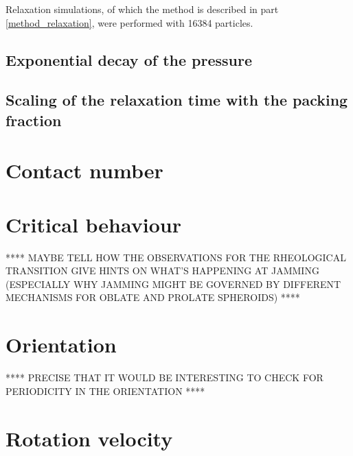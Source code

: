 \documentclass[class=report, float=false, crop=false]{standalone}
\begin{document}
Relaxation simulations, of which the method is described in part \ref{method_relaxation}, were performed with 16384 particles.\\



\subsection{Exponential decay of the pressure}

\subsection{Scaling of the relaxation time with the packing fraction}

\section{Contact number}

\section{Critical behaviour}

**** MAYBE TELL HOW THE OBSERVATIONS FOR THE RHEOLOGICAL TRANSITION GIVE HINTS ON WHAT'S HAPPENING AT JAMMING (ESPECIALLY WHY JAMMING MIGHT BE GOVERNED BY DIFFERENT MECHANISMS FOR OBLATE AND PROLATE SPHEROIDS) ****

\section{Orientation}

**** PRECISE THAT IT WOULD BE INTERESTING TO CHECK FOR PERIODICITY IN THE ORIENTATION ****

\section{Rotation velocity}

% 
\end{document}
